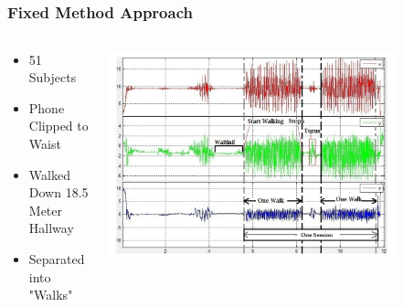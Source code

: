 \documentclass{beamer}
\begin{document}
\subsection{}
\begin{frame}
  \frametitle{Fixed Method Approach}
  \begin{columns}
  \begin{column}{0.4\textwidth}
  \begin{itemize}
  	\item 51 Subjects
  	\linebreak
    \item Phone Clipped to Waist 
  	\linebreak
  	\item Walked Down 18.5 Meter Hallway
  	\linebreak
  	\item Separated into "Walks"
  \end{itemize}
  \end{column}
  \begin{column}{0.8\textwidth}
   \includegraphics[width=0.8\textwidth]{Illustrations/gaitpatterns.png}
       \\
  \end{column}
  \end{columns}
\end{frame}
\end{document}
